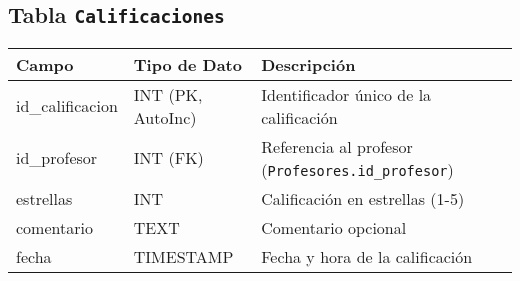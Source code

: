 \documentclass[11pt]{article}
\begin{document}
\subsection{Tabla \texttt{Calificaciones}}
\begin{center}
\begin{tabularx}{\textwidth}{@{}p{4cm}p{3cm}X@{}}
\toprule
\textbf{Campo} & \textbf{Tipo de Dato} & \textbf{Descripción} \\ \midrule
id\_calificacion & INT (PK, AutoInc) & Identificador único de la calificación \\
id\_profesor   & INT (FK)           & Referencia al profesor (\texttt{Profesores.id\_profesor}) \\
estrellas      & INT                & Calificación en estrellas (1-5) \\
comentario     & TEXT               & Comentario opcional \\
fecha          & TIMESTAMP          & Fecha y hora de la calificación \\ \bottomrule
\end{tabularx}
\end{center}
\end{document}
